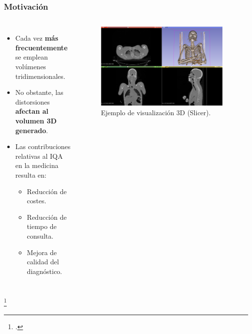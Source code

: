 \begin{frame}
  \frametitle{Motivación}
  \begin{columns}
    \begin{itemize}
    \item Cada vez \textbf{más frecuentemente} se emplean volúmenes tridimensionales.
    \item No obstante, las distorsiones \textbf{afectan al volumen 3D generado}. 
    \item Las contribuciones relativas al IQA en la medicina resulta en: 
      \begin{itemize}
        \item Reducción de costes. 
        \item Reducción de tiempo de consulta.
        \item Mejora de calidad del diagnóstico.
      \end{itemize}
    \end{itemize}
  \begin{figure}
    \begin{center}
      \includegraphics[width=0.95\textwidth]{imagenes/chapter1/SlicerVisualization}
    \end{center}
    \caption{Ejemplo de visualización 3D (Slicer\footnotemark).}
  \end{figure}
  \end{columns}
  \footcitetext{Slicer3D}
\end{frame}


